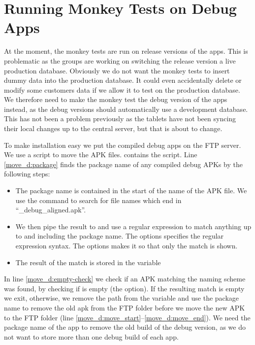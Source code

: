 \chapter{Running Monkey Tests on Debug Apps}
At the moment, the monkey tests are run on release versions of the apps. This is problematic as the \db groups are working on switching the release version a live production database. Obviously we do not want the monkey tests to insert dummy data into the production database. It could even accidentally delete or modify some customers data if we allow it to test on the production database. We therefore need to make the monkey test the debug version of the apps instead, as the debug versions should automatically use a development database. This has not been a problem previously as the tablets have not been syncing their local changes up to the central server, but that is about to change.

To make installation easy we put the compiled debug apps on the FTP server. We use a  script to move the APK files.  contains the script. Line \ref{move_d:package} finds the package name of any compiled debug APKs by the following steps:

\begin{itemize}
  \item The package name is contained in the start of the name of the APK file. We use the  command to search for file names which end in ``\_debug\_aligned.apk''.
  \item We then pipe the result to  and use a regular expression to match anything up to and including the package name. The  options specifies the regular expression syntax. The  options makes it so that only the match is shown.
  \item The result of the match is stored in the variable 
\end{itemize}

In line \ref{move_d:empty-check} we check if an APK matching the naming scheme was found, by checking if  is empty (the  option). If the resulting match is empty we exit, otherwise, we remove the path from the variable  and use the package name to remove the old apk from the FTP folder before we move the new APK to the FTP folder (line \ref{move_d:move_start}--\ref{move_d:move_end}). We need the package name of the app to remove the old build of the debug version, as we do not want to store more than one debug build of each app.

